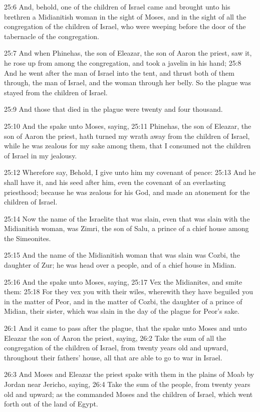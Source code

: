 25:6 And, behold, one of the children of Israel came and brought unto his brethren a Midianitish woman in the sight of Moses, and in the sight of all the congregation of the children of Israel, who were weeping before the door of the tabernacle of the congregation.

25:7 And when Phinehas, the son of Eleazar, the son of Aaron the priest, saw it, he rose up from among the congregation, and took a javelin in his hand; 25:8 And he went after the man of Israel into the tent, and thrust both of them through, the man of Israel, and the woman through her belly. So the plague was stayed from the children of Israel.

25:9 And those that died in the plague were twenty and four thousand.

25:10 And the \LORD spake unto Moses, saying, 25:11 Phinehas, the son of Eleazar, the son of Aaron the priest, hath turned my wrath away from the children of Israel, while he was zealous for my sake among them, that I consumed not the children of Israel in my jealousy.

25:12 Wherefore say, Behold, I give unto him my covenant of peace: 25:13 And he shall have it, and his seed after him, even the covenant of an everlasting priesthood; because he was zealous for his God, and made an atonement for the children of Israel.

25:14 Now the name of the Israelite that was slain, even that was slain with the Midianitish woman, was Zimri, the son of Salu, a prince of a chief house among the Simeonites.

25:15 And the name of the Midianitish woman that was slain was Cozbi, the daughter of Zur; he was head over a people, and of a chief house in Midian.

25:16 And the \LORD spake unto Moses, saying, 25:17 Vex the Midianites, and smite them: 25:18 For they vex you with their wiles, wherewith they have beguiled you in the matter of Peor, and in the matter of Cozbi, the daughter of a prince of Midian, their sister, which was slain in the day of the plague for Peor's sake.

26:1 And it came to pass after the plague, that the \LORD spake unto Moses and unto Eleazar the son of Aaron the priest, saying, 26:2 Take the sum of all the congregation of the children of Israel, from twenty years old and upward, throughout their fathers' house, all that are able to go to war in Israel.

26:3 And Moses and Eleazar the priest spake with them in the plains of Moab by Jordan near Jericho, saying, 26:4 Take the sum of the people, from twenty years old and upward; as the \LORD commanded Moses and the children of Israel, which went forth out of the land of Egypt.

